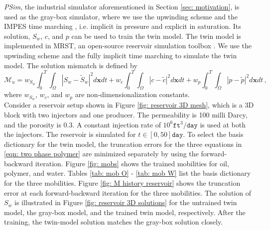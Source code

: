 \emph{PSim}, the industrial simulator aforementioned in Section \ref{sec: motivation}, is
used as the gray-box simulator, where we use the upwinding scheme and the IMPES time marching 
\cite{reservoir sim book}, i.e. implicit in pressure
and explicit in saturation.
Its solution, $S_w$, $c$, and $p$ can be used to train the 
twin model. The twin model is implemented in MRST, an open-source reservoir simulation toolbox
\cite{MRST}.
We use the upwinding scheme and the fully implicit time marching to simulate the twin model.
The solution mismatch is defined by
\begin{equation}
    \mathcal{M}_u = w_{S_w}\int_0^T\int_\Omega |S_w-\tilde{S}_w|^2 d\boldsymbol{x} dt
                + w_{c}\int_0^T\int_\Omega |c-\tilde{c}|^2 d\boldsymbol{x} dt 
                + w_{p}\int_{0}^T\int_\Omega |p-\tilde{p}|^2 d\boldsymbol{x} dt\,,
    \label{eqn: polymer sol mismatch}
\end{equation}
where $w_{S_w}$, $w_c$, and $w_p$ are non-dimensionalization constants.\\


Consider a reservoir setup shown in Figure \ref{fig: reservoir 3D mesh}, which
is a 3D block with two injectors and one producer. The permeability
is 100 milli Darcy, and the porosity is 0.3. A constant injection rate of $10^6 
\texttt{ft}^3/\texttt{day}$ is used at both the injectors.
The reservoir is simulated for $t\in [0,50] \texttt{day}$.
To select the basis dictionary for the twin model, the truncation errors for the 
three equations in \eqref{eqn: two phase polymer} are minimized separately by using the forward-backward
iteration.
Figure \ref{fig: mobs} shows the trained mobilities for
oil, polymer, and water. Tables \ref{tab: mob O} - \ref{tab: mob W} list the
basis dictionary for the three mobilities. 
Figure \ref{fig: M history reservoir} shows the truncation error at each forward-backward
iteration for the three mobilities.
The solution of $S_w$ is illustrated in Figure \ref{fig: reservoir 3D solutions} for the untrained 
twin model, the gray-box model, and the trained twin model, respectively. 
After the training, the twin-model solution matches the gray-box solution closely.\\

